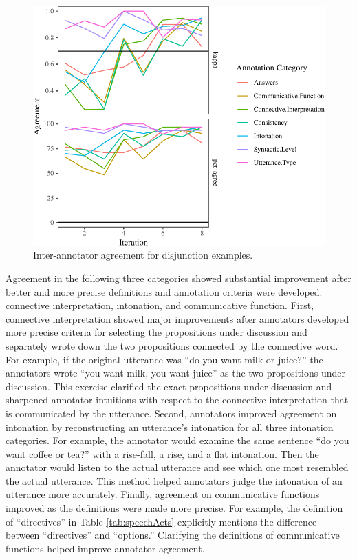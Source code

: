 \documentclass[
  english,
  ,man,floatsintext]{apa6}
\begin{document}
\begin{figure}[tb]

{\centering \includegraphics{figs/oReliabilityPlot-1} 

}

\caption{Inter-annotator agreement for disjunction examples.}\label{fig:oReliabilityPlot}
\end{figure}

Agreement in the following three categories showed substantial improvement after better and more precise definitions and annotation criteria were developed: connective interpretation, intonation, and communicative function. First, connective interpretation showed major improvements after annotators developed more precise criteria for selecting the propositions under discussion and separately wrote down the two propositions connected by the connective word. For example, if the original utterance was ``do you want milk or juice?'' the annotators wrote ``you want milk, you want juice'' as the two propositions under discussion. This exercise clarified the exact propositions under discussion and sharpened annotator intuitions with respect to the connective interpretation that is communicated by the utterance. Second, annotators improved agreement on intonation by reconstructing an utterance's intonation for all three intonation categories. For example, the annotator would examine the same sentence ``do you want coffee or tea?'' with a rise-fall, a rise, and a flat intonation. Then the annotator would listen to the actual utterance and see which one most resembled the actual utterance. This method helped annotators judge the intonation of an utterance more accurately. Finally, agreement on communicative functions improved as the definitions were made more precise. For example, the definition of ``directives'' in Table \ref{tab:speechActs} explicitly mentions the difference between ``directives'' and ``options.'' Clarifying the definitions of communicative functions helped improve annotator agreement.
\end{document}
